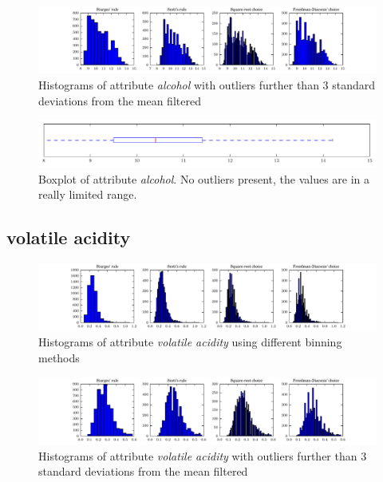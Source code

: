 \documentclass{report}
\begin{document}
\begin{figure}[H]
\includegraphics[width=\textwidth]{histograms/alcohol_filtered.pdf}
\caption{Histograms of attribute \emph{alcohol} with outliers further than 3 standard deviations from the mean filtered}
\end{figure}

\begin{figure}[H]
\includegraphics[width=\textwidth]{boxplots/alcohol.pdf}
\caption{Boxplot of attribute \emph{alcohol}. No outliers present, the values are in a really limited range.}\end{figure}

\newpage
\subsection{volatile acidity}
\begin{figure}[H]
\includegraphics[width=\textwidth]{histograms/volatile_acidity.pdf}
\caption{Histograms of attribute \emph{volatile acidity} using different binning methods}\end{figure}

\begin{figure}[H]
\includegraphics[width=\textwidth]{histograms/volatile_acidity_filtered.pdf}
\caption{Histograms of attribute \emph{volatile acidity} with outliers further than 3 standard deviations from the mean filtered}
\end{figure}
\end{document}
